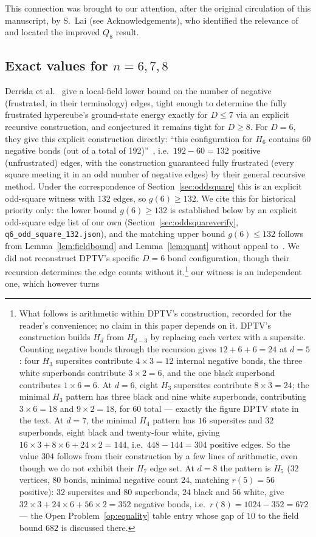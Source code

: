 \documentclass[12pt]{article}
\begin{document}
This connection was brought to our attention, after the original circulation
of this manuscript, by S.~Lai (see Acknowledgements), who identified the
relevance of~\cite{DPTV79,MPR95} and located the improved $Q_8$ result.

\subsection{Exact values for \texorpdfstring{$n=6,7,8$}{n=6,7,8}}\label{sec:oddsquare-exact}

Derrida et al.~\cite{DPTV79} give a local-field lower bound on the number of
negative (frustrated, in their terminology) edges, tight enough to
determine the fully frustrated hypercube's ground-state energy exactly
for $D\le7$ via an explicit recursive construction, and conjectured it
remains tight for $D\ge8$. For $D=6$, they give this explicit
construction directly: ``this configuration for $H_6$ contains 60
negative bonds (out of a total of 192)''~\cite[p.~622]{DPTV79}, i.e.\
$192-60=132$ positive (unfrustrated) edges, with the construction
guaranteed fully frustrated (every square meeting it in an odd number
of negative edges) by their general recursive method. Under the
correspondence of Section~\ref{sec:oddsquare} this is an explicit
odd-square witness with $132$ edges, so $g(6)\ge132$. We cite this for
historical priority only: the lower bound $g(6)\ge132$ is established
below by an explicit odd-square edge list of our own
(Section~\ref{sec:oddsquareverify}, \texttt{q6\_odd\_square\_132.json}),
and the matching upper bound $g(6)\le132$ follows from
Lemma~\ref{lem:fieldbound} and Lemma~\ref{lem:quant} without appeal
to~\cite{HN94}. We did not reconstruct DPTV's specific $D=6$ bond
configuration, though their recursion determines the edge counts without
it.\footnote{What follows is arithmetic within DPTV's construction, recorded for
the reader's convenience; no claim in this paper depends on it.
DPTV's construction builds $H_d$ from $H_{d-3}$ by replacing each
vertex with a supersite. Counting negative bonds through the recursion gives
$12+6+6=24$ at $d=5$: four $H_3$ supersites contribute $4\times3=12$
internal negative bonds, the three white superbonds contribute
$3\times2=6$, and the one black superbond contributes $1\times6=6$.
At $d=6$, eight $H_3$ supersites contribute $8\times3=24$; the
minimal $H_3$ pattern has three black and nine white superbonds, contributing
$3\times6=18$ and $9\times2=18$, for $60$ total --- exactly the figure
DPTV state in the text. At $d=7$, the minimal $H_4$ pattern has $16$
supersites and $32$ superbonds, eight black and twenty-four white, giving
$16\times3+8\times6+24\times2=144$, i.e.\ $448-144=304$ positive edges. So the value $304$ follows from their construction by a few
lines of arithmetic, even though we do not exhibit their $H_7$ edge set.
At $d=8$ the pattern is $H_5$ ($32$ vertices, $80$ bonds, minimal negative
count $24$, matching $r(5)=56$ positive): $32$ supersites and $80$
superbonds, $24$ black and $56$ white, give
$32\times3+24\times6+56\times2=352$ negative bonds, i.e.\
$r(8)=1024-352=672$ --- the Open Problem~\ref{op:equality} table entry whose
gap of $10$ to the field bound $682$ is discussed there.} our witness is an independent one, which however turns
\end{document}
